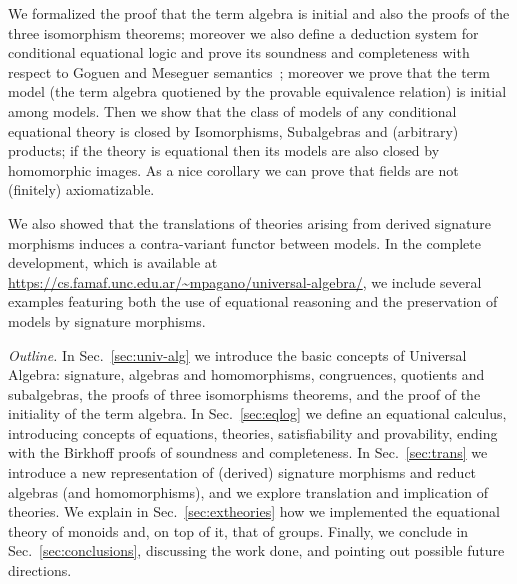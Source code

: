 We formalized the proof that the term algebra is initial and also the
proofs of the three isomorphism theorems; moreover we also define a
deduction system for conditional equational logic and prove its
soundness and completeness with respect to Goguen and Meseguer
semantics~\citeyearpar{GoguenM82}; moreover we prove that the term model (the
term algebra quotiened by the provable equivalence relation) is
initial among models. Then we show that the class of models of any
conditional equational theory is closed by Isomorphisms, Subalgebras
and (arbitrary) products; if the theory is equational then its models
are also closed by homomorphic images. As a nice corollary we can
prove that fields are not (finitely) axiomatizable.

We also showed that the translations of theories arising from derived
signature morphisms induces a contra-variant functor between models.
In the complete development, which is available at
\url{https://cs.famaf.unc.edu.ar/~mpagano/universal-algebra/}, we
include several examples featuring both the use of equational
reasoning and the preservation of models by signature morphisms.

\textit{Outline.} In Sec.~\ref{sec:univ-alg} we introduce the basic
concepts of Universal Algebra: signature, algebras and homomorphisms,
congruences, quotients and subalgebras, the proofs of three
isomorphisms theorems, and the proof of the initiality of the term
algebra.  In Sec.~\ref{sec:eqlog} we define an equational calculus,
introducing concepts of equations, theories, satisfiability and
provability, ending with the Birkhoff proofs of soundness and
completeness.  In Sec.~\ref{sec:trans} we introduce a new
representation of (derived) signature morphisms and reduct algebras
(and homomorphisms), and we explore translation and implication of
theories. We explain in Sec.~\ref{sec:extheories} how we implemented
the equational theory of monoids and, on top of it, that of groups.
Finally, we conclude in Sec.~\ref{sec:conclusions}, discussing the
work done, and pointing out possible future directions.

